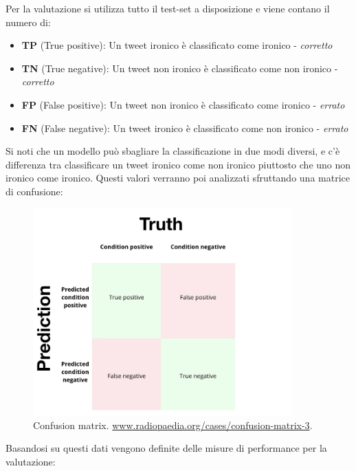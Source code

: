 \documentclass[oneside]{book}
\begin{document}
Per la valutazione si utilizza tutto il test-set a disposizione e viene contano il numero di:
\begin{itemize}
	\item \textbf{TP} (True positive): Un tweet ironico è classificato come ironico - \emph{corretto}
	
	\item \textbf{TN} (True negative): Un tweet non ironico è classificato come non ironico - \emph{corretto}
	
	\item \textbf{FP} (False positive):	Un tweet non ironico è classificato come ironico - \emph{errato}
	
	\item \textbf{FN} (False negative):	Un tweet ironico è classificato come non ironico - \emph{errato}
\end{itemize}
Si noti che un modello può sbagliare la classificazione in due modi diversi, e c'è differenza tra classificare un tweet ironico come non ironico piuttosto che uno non ironico come ironico. Questi valori verranno poi analizzati sfruttando una matrice di confusione:

\begin{figure}[!h]
	\centering
	\includegraphics[width=10cm]{assets/confusion-matrix.jpg}
	\caption{Confusion matrix. \url{www.radiopaedia.org/cases/confusion-matrix-3}.}
	\label{fig:decision-tree}
\end{figure}

Basandosi su questi dati vengono definite delle misure di performance per la valutazione:
\end{document}
